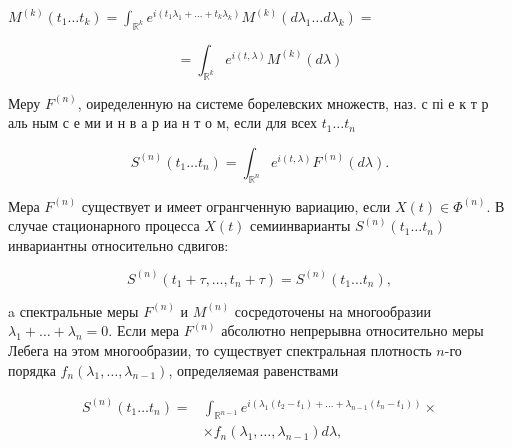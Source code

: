 \documentclass[10pt]{article}
\begin{document}
$M^{(k)}\left(t_{1} \ldots t_{k}\right)=\int_{\mathbb{R}^{k}} e^{i\left(t_{1} \lambda_{1}+\ldots+t_{k} \lambda_{k}\right)} M^{(k)}\left(d \lambda_{1} \ldots d \lambda_{k}\right)=$



\[

=\int_{\mathbb{R}^{k}} e^{i(t, \lambda)} M^{(k)}(d \lambda)

\]



Меру $F^{(n)}$, оиределенную на системе борелевских множеств, наз. с пі е к т р аль ным с е ми и н в а р иа н т о м, если для всех $t_{1} \ldots t_{n}$



\[

S^{(n)}\left(t_{1} \ldots t_{n}\right)=\int_{\mathbb{R}^{n}} e^{i(t, \lambda)} F^{(n)}(d \lambda) .

\]



Мера $F^{(n)}$ существует и имеет огрангченную вариацию, если $X(t) \in \Phi^{(n)}$. В случае стационарного процесса $X(t)$ семиинварианты $S^{(n)}\left(t_{1} \ldots t_{n}\right) \quad$ инвариантны относительно сдвигов:



\[

S^{(n)}\left(t_{1}+\tau, \ldots, t_{n}+\tau\right)=S^{(n)}\left(t_{1} \ldots t_{n}\right),

\]



a спектральные меры $F^{(n)}$ и $M^{(n)}$ сосредоточены на многообразии $\lambda_{1}+\ldots+\lambda_{n}=0$. Если мера $F^{(n)}$ абсолютно непрерывна относительно меры Лебега на этом многообразии, то существует спектральная плотность $n$-го порядка $f_{n}\left(\lambda_{1}, \ldots, \lambda_{n-1}\right)$, определяемая равенствами



\[

\begin{aligned}

S^{(n)}\left(t_{1} \ldots t_{n}\right)= & \int_{\mathbb{R}^{n-1}} e^{i\left(\lambda_{1}\left(t_{2}-t_{1}\right)+\ldots+\lambda_{n-1}\left(t_{n}-t_{1}\right)\right)} \times \\

& \times f_{n}\left(\lambda_{1}, \ldots, \lambda_{n-1}\right) d \lambda,

\end{aligned}

\]
\end{document}
